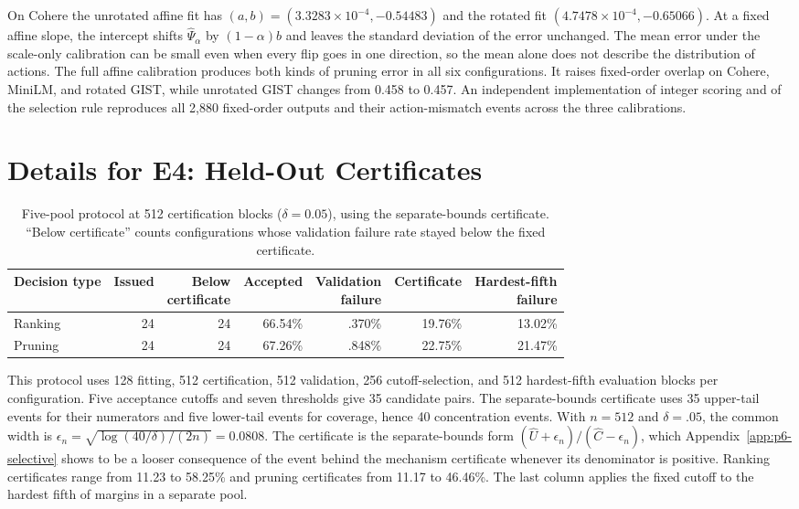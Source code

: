 On Cohere the unrotated affine fit has $(a,b)=(3.3283\times10^{-4},-0.54483)$ and the rotated fit $(4.7478\times10^{-4},-0.65066)$. At a fixed affine slope, the intercept shifts $\widehat\Psi_\alpha$ by $(1-\alpha)b$ and leaves the standard deviation of the error unchanged. The mean error under the scale-only calibration can be small even when every flip goes in one direction, so the mean alone does not describe the distribution of actions. The full affine calibration produces both kinds of pruning error in all six configurations. It raises fixed-order overlap on Cohere, MiniLM, and rotated GIST, while unrotated GIST changes from 0.458 to 0.457. An independent implementation of integer scoring and of the selection rule reproduces all 2{,}880 fixed-order outputs and their action-mismatch events across the three calibrations.

\section{Details for E4: Held-Out Certificates}
\label{app:heldout}

\begin{table}[tbp]
\centering


\small
\begin{tabular}{lrrrrrr}
\toprule
Decision type & Issued & \shortstack{Below\\certificate} & Accepted & \shortstack{Validation\\failure} & Certificate & \shortstack{Hardest-fifth\\failure} \\
\midrule
Ranking & 24 & 24 & 66.54\% & .370\% & 19.76\% & 13.02\% \\
Pruning & 24 & 24 & 67.26\% & .848\% & 22.75\% & 21.47\% \\
\bottomrule
\end{tabular}

\small
\caption{Five-pool protocol at 512 certification blocks ($\delta=0.05$), using the separate-bounds certificate. ``Below certificate'' counts configurations whose validation failure rate stayed below the fixed certificate.}
\label{tab:app-p6}
\end{table}

This protocol uses 128 fitting, 512 certification, 512 validation, 256 cutoff-selection, and 512 hardest-fifth evaluation blocks per configuration. Five acceptance cutoffs and seven thresholds give 35 candidate pairs. The separate-bounds certificate uses 35 upper-tail events for their numerators and five lower-tail events for coverage, hence 40 concentration events. With $n=512$ and $\delta=.05$, the common width is $\epsilon_n=\sqrt{\log(40/\delta)/(2n)}=0.0808$. The certificate is the separate-bounds form $(\widehat U+\epsilon_n)/(\widehat C-\epsilon_n)$, which Appendix~\ref{app:p6-selective} shows to be a looser consequence of the event behind the mechanism certificate whenever its denominator is positive. Ranking certificates range from 11.23 to 58.25\% and pruning certificates from 11.17 to 46.46\%. The last column applies the fixed cutoff to the hardest fifth of margins in a separate pool.

